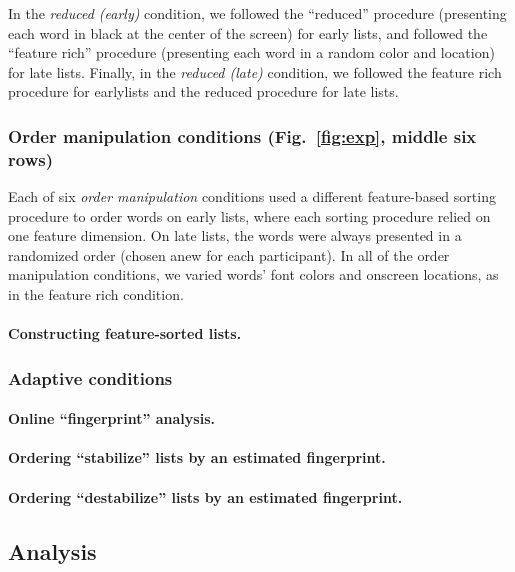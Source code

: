 \documentclass[11pt]{article}
\begin{document}
In the \textit{reduced (early)} condition, we followed the ``reduced''
procedure (presenting each word in black at the center of the screen) for early
lists, and followed the ``feature rich'' procedure (presenting each word in a
random color and location) for late lists. Finally, in the \textit{reduced
(late)} condition, we followed the feature rich procedure for earlylists and
the reduced procedure for late lists.

\subsubsection*{Order manipulation conditions (Fig.~\ref{fig:exp}, middle six
rows)}

Each of six \textit{order manipulation} conditions used a different
feature-based sorting procedure to order words on early lists, where each
sorting procedure relied on one feature dimension. On late lists, the words
were always presented in a randomized order (chosen anew for each participant).
In all of the order manipulation conditions, we varied words' font colors and
onscreen locations, as in the feature rich condition.

\paragraph{Constructing feature-sorted lists.}


\subsubsection*{Adaptive conditions}

\paragraph{Online ``fingerprint'' analysis.}

\paragraph{Ordering ``stabilize'' lists by an estimated fingerprint.}

\paragraph{Ordering ``destabilize'' lists by an estimated fingerprint.}

\subsection*{Analysis}
\end{document}

